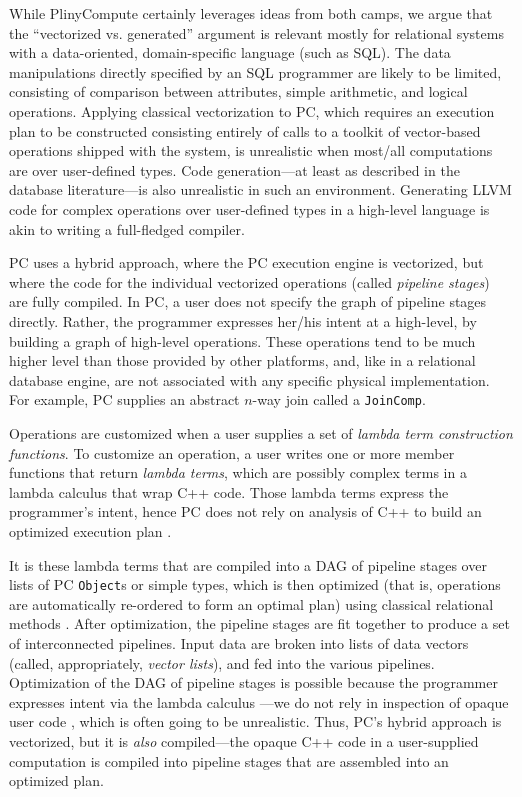 While PlinyCompute certainly leverages ideas from both camps, we argue that the ``vectorized vs. generated'' argument is relevant mostly for 
relational systems with a data-oriented, domain-specific language (such as SQL).  
The data manipulations directly specified by an SQL programmer are likely to be limited, 
consisting of comparison between attributes, simple arithmetic, and logical operations.
Applying classical vectorization to PC,
which requires an execution plan to be constructed consisting entirely of calls to a toolkit of
vector-based operations shipped with the system, is
unrealistic when most/all computations are over user-defined types.  Code generation---at least as described in the database literature---is also
unrealistic in such an environment.  Generating LLVM code for complex operations over user-defined types 
in a high-level language 
is akin to writing a full-fledged compiler. 


PC uses a hybrid approach, where the PC execution engine is vectorized, but where the code for the individual vectorized operations (called \emph{pipeline stages})
are fully compiled.  
In PC, a user does not specify the graph of pipeline stages directly.  Rather,
the programmer expresses her/his intent at a high-level, by building a graph of high-level operations.  These operations tend to be much higher
level than those provided by other platforms, and, like in a relational database engine, are not associated with any specific 
physical implementation.
For example, PC supplies an abstract $n$-way join called a \texttt{JoinComp}.

Operations are customized when a user supplies a set of 
\emph{lambda term
construction functions}.  To customize an operation, a user writes one or more member functions
that return \emph{lambda terms}, which are possibly complex terms in a lambda calculus that 
wrap C++ code.  Those lambda terms express the programmer's intent, hence PC does not rely on analysis of C++ to build an optimized
execution plan \cite{alexandrov2015implicit}. 

It is these lambda terms that are compiled into a DAG of pipeline stages over
lists of PC \texttt{Object}s or simple types,
which is then optimized (that is, operations are automatically
re-ordered to form an optimal plan) using classical relational
methods \cite{chaudhuri1998overview, graefe1995cascades, jarke1984query}. After optimization, the pipeline stages are fit together to produce a set of interconnected pipelines.  Input data are broken into lists of 
data vectors (called, appropriately, \emph{vector lists}), and fed into the various pipelines.
Optimization of the DAG of pipeline stages
is possible because the programmer expresses intent via the lambda calculus \cite{barendregt1984lambda, moggi1989computational}---we do not rely in inspection of opaque user
code \cite{alexandrov2015implicit}, which is often going to be unrealistic.  Thus, PC's hybrid approach is vectorized, 
but it is \emph{also} compiled---the opaque C++ code in a user-supplied computation is compiled into pipeline stages that are assembled into an 
optimized plan.

